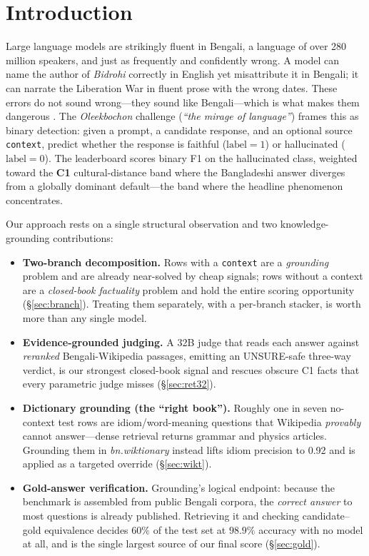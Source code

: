 \documentclass[11pt]{article}
\begin{document}
\section{Introduction}
Large language models are strikingly fluent in Bengali, a language of over
280 million speakers, and just as frequently and confidently wrong. A model
can name the author of \emph{Bidrohi} correctly in English yet misattribute it
in Bengali; it can narrate the Liberation War in fluent prose with the wrong
dates. These errors do not sound wrong---they sound like Bengali---which is
what makes them dangerous \citep{ji2023survey,guerreiro2023hallucinations}. The
\emph{Oleekbochon} challenge (\emph{``the mirage of language''}) frames this as
binary detection: given a prompt, a candidate response, and an optional source
\texttt{context}, predict whether the response is faithful ($\text{label}=1$)
or hallucinated ($\text{label}=0$). The leaderboard scores binary F1 on the
hallucinated class, weighted toward the \textbf{C1} cultural-distance band
where the Bangladeshi answer diverges from a globally dominant default---the
band where the headline phenomenon concentrates.

Our approach rests on a single structural observation and two knowledge-grounding
contributions:

\begin{itemize}
\item \textbf{Two-branch decomposition.} Rows with a \texttt{context} are a
\emph{grounding} problem and are already near-solved by cheap signals; rows
without a context are a \emph{closed-book factuality} problem and hold the
entire scoring opportunity (\S\ref{sec:branch}). Treating them separately, with
a per-branch stacker, is worth more than any single model.
\item \textbf{Evidence-grounded judging.} A 32B judge that reads each answer
against \emph{reranked} Bengali-Wikipedia passages, emitting an UNSURE-safe
three-way verdict, is our strongest closed-book signal and rescues obscure
C1 facts that every parametric judge misses (\S\ref{sec:ret32}).
\item \textbf{Dictionary grounding (the ``right book'').} Roughly one in seven
no-context test rows are idiom/word-meaning questions that Wikipedia
\emph{provably} cannot answer---dense retrieval returns grammar and physics
articles. Grounding them in \emph{bn.wiktionary} instead lifts idiom precision
to 0.92 and is applied as a targeted override (\S\ref{sec:wikt}).
\item \textbf{Gold-answer verification.} Grounding's logical endpoint: because
the benchmark is assembled from public Bengali corpora, the \emph{correct
answer} to most questions is already published. Retrieving it and checking
candidate--gold equivalence decides $60\%$ of the test set at $98.9\%$ accuracy
with no model at all, and is the single largest source of our final score
(\S\ref{sec:gold}).
\end{itemize}
\end{document}
